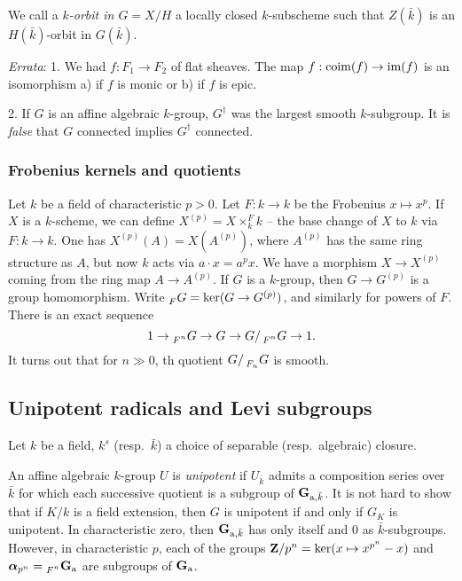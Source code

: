 We call a \emph{$k$-orbit in $G=X/H$} a locally closed $k$-subscheme such that 
$Z(\bar k)$ is an $H(\bar k)$-orbit in $G(\bar k)$. 

\emph{Errata}: 1. We had $f:F_1\to F_2$ of flat sheaves. The map 
$f:\operatorname{coim}(f) \to \operatorname{im}(f)$ is an isomorphism a) if $f$ is monic or b) if 
$f$ is epic. 

2. If $G$ is an affine algebraic $k$-group, $G^\dagger$ was the largest smooth 
$k$-subgroup. It is \emph{false} that $G$ connected implies $G^\dagger$ connected. 


\subsubsection{Frobenius kernels and quotients}

Let $k$ be a field of characteristic $p>0$. Let $F:k\to k$ be the Frobenius 
$x\mapsto x^p$. If $X$ is a $k$-scheme, we can define 
$X^{(p)}=X\times_k^F k$ -- the base change of $X$ to $k$ via $F:k\to k$. 
One has $X^{(p)}(A) = X(A^{(p)})$,  where 
$A^{(p)}$ has the same ring structure as $A$, but now $k$ acts via 
$a\cdot x = a^p x$. We have a morphism $X\to X^{(p)}$ coming from the 
ring map $A\to A^{(p)}$. If $G$ is a $k$-group, then $G\to G^{(p)}$ is a 
group homomorphism. Write $\prescript{}{F}{G}=\ker(G\to G^{(p)})$, and 
similarly for powers of $F$. There is an exact sequence 
\[
  1 \to \prescript{}{F^n}{G} \to G \to G/\prescript{}{F^n}{G} \to 1 .
\]
It turns out that for $n\gg 0$, th quotient $G/\prescript{}{F_n}{G}$ is 
smooth. 





\subsection{Unipotent radicals and Levi subgroups}

Let $k$ be a field, $k^s$ (resp.\ $\bar k$) a choice of separable (resp.\ algebraic) 
closure. 

An affine algebraic $k$-group $U$ is \emph{unipotent} if $U_{\bar k}$ admits 
a composition series over $\bar k$ for which each successive quotient is a subgroup 
of $\mathbf{G}_{\mathrm{a}, \bar k}$. It is not hard to show that if $K/k$ is a field 
extension, then $G$ is unipotent if and only if $G_K$ is unipotent. In 
characteristic zero, then $\mathbf{G}_{\mathrm{a},\bar k}$ has only itself and $0$ as 
$\bar k$-subgroups. However, in characteristic $p$, each of the groups 
$\mathbf{Z}/p^n = \ker(x\mapsto x^{p^n}-x)$ and 
$\boldsymbol\alpha_{p^n} = \prescript{}{F^n}{\mathbf{G}_{\mathrm{a}}}$ are subgroups of 
$\mathbf{G}_{\mathrm{a}}$. 

